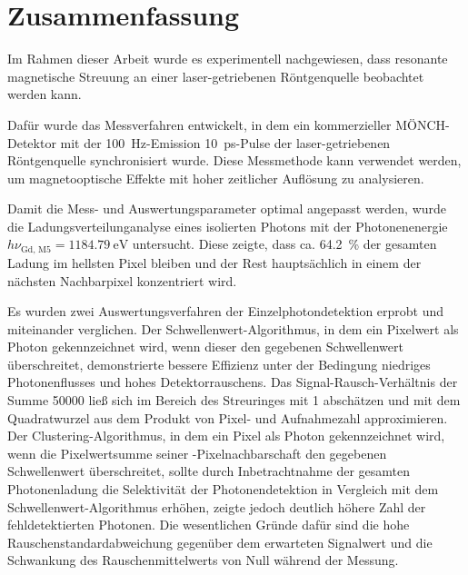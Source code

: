 \chapter{Zusammenfassung}
Im Rahmen dieser Arbeit wurde es experimentell nachgewiesen, dass resonante magnetische Streuung an einer laser-getriebenen Röntgenquelle beobachtet werden kann.
\begin{figure}[H]
    \centering
    
    \label{fig:summary_ring_no_ring}
\end{figure}
\noindent
Dafür wurde das Messverfahren entwickelt, in dem ein kommerzieller MÖNCH-Detektor mit der \SI{100}{\hertz}-Emission \SI{10}{\pico\second}-Pulse der laser-getriebenen Röntgenquelle synchronisiert wurde. Diese Messmethode kann verwendet werden, um magnetooptische Effekte mit hoher zeitlicher Auflösung zu analysieren. 

\noindent
Damit die Mess- und Auswertungsparameter optimal angepasst werden, wurde die Ladungsverteilunganalyse eines isolierten Photons mit der Photonenenergie $h\nu_\text{Gd, M5} = \SI{1184,79}{\eV}$ untersucht. Diese zeigte, dass ca. \SI{64,2}{\percent} der gesamten Ladung im hellsten Pixel bleiben und der Rest hauptsächlich in einem der nächsten Nachbarpixel konzentriert wird.

\noindent
Es wurden zwei Auswertungsverfahren der Einzelphotondetektion erprobt und miteinander verglichen. Der Schwellenwert-Algorithmus, in dem ein Pixelwert als Photon gekennzeichnet wird, wenn dieser den gegebenen Schwellenwert überschreitet, demonstrierte bessere Effizienz unter der Bedingung niedriges Photonenflusses und hohes Detektorrauschens. Das Signal-Rausch-Verhältnis der Summe \SI{50000}{\captures} ließ sich im Bereich des Streuringes mit 1 abschätzen und mit dem Quadratwurzel aus dem Produkt von Pixel- und Aufnahmezahl approximieren. Der Clustering-Algorithmus, in dem ein Pixel als Photon gekennzeichnet wird, wenn die Pixelwertsumme seiner -Pixelnachbarschaft den gegebenen Schwellenwert überschreitet, sollte durch Inbetrachtnahme der gesamten Photonenladung die Selektivität der Photonendetektion in Vergleich mit dem Schwellenwert-Algorithmus erhöhen, zeigte jedoch deutlich höhere Zahl der fehldetektierten Photonen. Die wesentlichen Gründe dafür sind die hohe Rauschenstandardabweichung gegenüber dem erwarteten Signalwert und die Schwankung des Rauschenmittelwerts von Null während der Messung.

